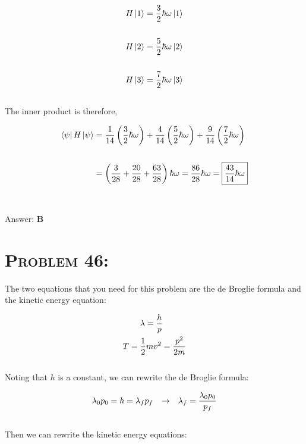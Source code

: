 \documentclass{article}
\begin{document}
\begin{align}
H \ket{1} &= \frac{3}{2} \hbar \omega  \ket{1}\nonumber\\
\nonumber\\
H \ket{2} &= \frac{5}{2} \hbar \omega  \ket{2}\nonumber\\
\nonumber\\
H \ket{3} &= \frac{7}{2} \hbar \omega  \ket{3}\nonumber
\end{align}
\\
The inner product is therefore,

\begin{align}
\bra{\psi}H \ket{\psi} &= \frac{1}{14} \left(   \frac{3}{2} \hbar \omega\right)  + \frac{4}{14} \left(   \frac{5}{2} \hbar \omega\right) +  \frac{9}{14} \left(   \frac{7}{2} \hbar \omega \right) \nonumber\\
\nonumber\\
&= \left(   \frac{3}{28}  + \frac{20}{28}  + \frac{63}{28} \right) \hbar \omega = \frac{86}{28} \hbar \omega = \boxed{\frac{43}{14} \hbar \omega}   \nonumber
\end{align}
\\\\
Answer: \textbf{\textcolor{ProcessBlue}B}\\


\section{\textsc{Problem 46:}} The two equations that you need for this problem are the de Broglie formula and the kinetic energy equation:

\begin{gather}
\lambda = \frac{h}{p} \hspace{.1in} \\
T = \frac{1}{2}mv^{2} = \frac{p^{2}}{2m}
\end{gather}
\\
Noting that $h$ is a constant, we can rewrite the de Broglie formula:

\begin{gather}
\lambda_{0} p_{0} = h = \lambda_{f} p_{f} \hspace{.1in} \rightarrow \hspace{.1in} \lambda_{f} = \frac{\lambda_{0} p_{0}}{p_{f}} \nonumber
\end{gather}
\\
Then we can rewrite the kinetic energy equations:
\end{document}
